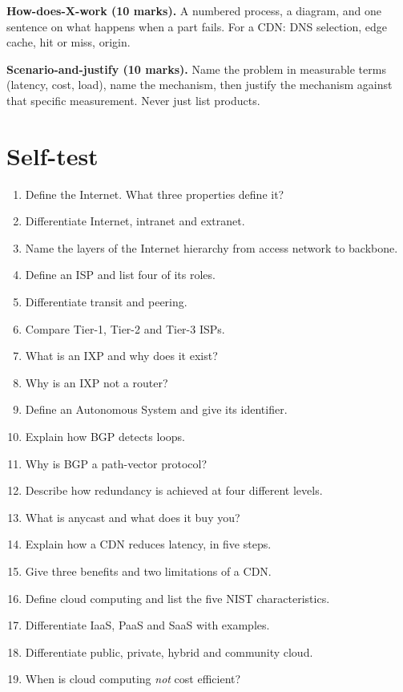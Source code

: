 \documentclass[11pt,a4paper]{article}
\begin{document}
\begin{answerbox}
\textbf{How-does-X-work (10 marks).} A numbered process, a diagram, and one sentence on what happens when a part fails. For a CDN: DNS selection, edge cache, hit or miss, origin.
\end{answerbox}

\begin{answerbox}
\textbf{Scenario-and-justify (10 marks).} Name the problem in measurable terms (latency, cost, load), name the mechanism, then justify the mechanism against that specific measurement. Never just list products.
\end{answerbox}

\section{Self-test}

\begin{enumerate}
\item Define the Internet. What three properties define it?
\item Differentiate Internet, intranet and extranet.
\item Name the layers of the Internet hierarchy from access network to backbone.
\item Define an ISP and list four of its roles.
\item Differentiate transit and peering.
\item Compare Tier-1, Tier-2 and Tier-3 ISPs.
\item What is an IXP and why does it exist?
\item Why is an IXP not a router?
\item Define an Autonomous System and give its identifier.
\item Explain how BGP detects loops.
\item Why is BGP a path-vector protocol?
\item Describe how redundancy is achieved at four different levels.
\item What is anycast and what does it buy you?
\item Explain how a CDN reduces latency, in five steps.
\item Give three benefits and two limitations of a CDN.
\item Define cloud computing and list the five NIST characteristics.
\item Differentiate IaaS, PaaS and SaaS with examples.
\item Differentiate public, private, hybrid and community cloud.
\item When is cloud computing \emph{not} cost efficient?
\end{enumerate}
\end{document}

